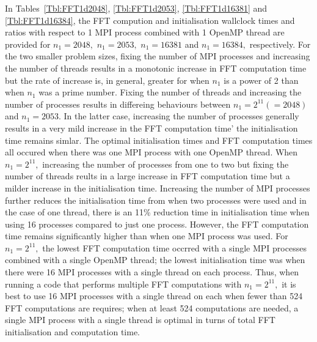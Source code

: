 \documentclass[a4]{article}
\begin{document}
In Tables~\ref{Tbl:FFT1d2048}, \ref{Tbl:FFT1d2053}, \ref{Tbl:FFT1d16381} and 
\ref{Tbl:FFT1d16384},  the FFT compution and initialisation wallclock times and 
ratios with respect to 1 MPI process combined with 1 OpenMP thread are provided 
for $n_1=2048,$ $n_1=2053,$  $n_1=16381$ and  $n_1=16384,$ respectively. For the 
two smaller problem sizes, fixing the number of MPI processes and increasing the 
number of threads results in a monotonic increase in FFT computation time but the
 rate of increase is, in general, greater for when $n_1$ is a power of 2 than 
when $n_1$ was a prime number. Fixing the number of threads and increasing the 
number of processes results in differeing behaviours between $n_1=2^{11}(=2048)$ 
and $n_1=2053.$ In the latter case, increasing the number of processes generally 
results in a very mild increase in the FFT computation time' the initialisation 
time remains simlar. The optimal initialisation times and FFT computation times 
all occured when there was one MPI process with one OpenMP thread.  When 
$n_1=2^{11},$ increasing the number of processes from one to two but fixing the 
number of threads reults in a large increase in FFT computation time but a milder 
increase in the initialisation time. Increasing the number of MPI processes 
further reduces the initialisation time from when two processes were used and in 
the case of one thread, there is an 11\% reduction time in initialisation time 
when using 16 processes compared to just one process. However, the FFT 
computation time remains significantly higher than when one MPI process was used. 
For $n_1=2^{11},$ the lowest FFT computation time occrred with a single MPI 
processes combined with a single OpenMP thread; the lowest initialisation time 
was when there were 16 MPI processes with a single thread on each process. Thus, 
when running a code that performs multiple FFT computations with $n_1=2^{11},$ it 
is best to use 16 MPI processes with a single thread on each when fewer than 524 
FFT computations are requires; when at least 524 computations are needed, a single 
MPI process with a single thread is optimal in turns of total FFT initialisation 
and computation time. 
\end{document}
